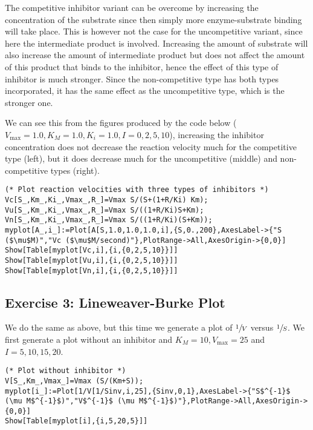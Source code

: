 \documentclass[11pt,a4paper,onecolumn]{article}
\begin{document}
The competitive inhibitor variant can be overcome by increasing the concentration of the substrate since then simply more enzyme-substrate binding will take place. This is however not the case for the uncompetitive variant, since here the intermediate product is involved. Increasing the amount of substrate will also increase the amount of intermediate product but does not affect the amount of this product that binds to the inhibitor, hence the effect of this type of inhibitor is much stronger. Since the non-competitive type has both types incorporated, it has the same effect as the uncompetitive type, which is the stronger one.

We can see this from the figures produced by the code below ($V_{\text{max}} = 1.0, K_M = 1.0, K_i = 1.0, I = 0,2,5,10$), increasing the inhibitor concentration does not decrease the reaction velocity much for the competitive type (left), but it does decrease much for the uncompetitive (middle) and non-competitive types (right).

\begin{lstlisting}[mathescape]
(* Plot reaction velocities with three types of inhibitors *)
Vc[S_,Km_,Ki_,Vmax_,R_]=Vmax S/(S+(1+R/Ki) Km);
Vu[S_,Km_,Ki_,Vmax_,R_]=Vmax S/((1+R/Ki)S+Km);
Vn[S_,Km_,Ki_,Vmax_,R_]=Vmax S/((1+R/Ki)(S+Km));
myplot[A_,i_]:=Plot[A[S,1.0,1.0,1.0,i],{S,0.,200},AxesLabel->{"S ($\mu$M)","Vc ($\mu$M/second)"},PlotRange->All,AxesOrigin->{0,0}]
Show[Table[myplot[Vc,i],{i,{0,2,5,10}}]]
Show[Table[myplot[Vu,i],{i,{0,2,5,10}}]]
Show[Table[myplot[Vn,i],{i,{0,2,5,10}}]] 
\end{lstlisting}

\begin{figure}[H]
  \centering
\end{figure}

\subsection{Exercise 3: Lineweaver-Burke Plot}
We do the same as above, but this time we generate a plot of $\sfrac{1}{V}$ versus $\sfrac{1}{S}$. We first generate a plot without an inhibitor and $K_M = 10, V_{\text{max}} = 25$ and $I = 5,10,15,20$.

\begin{lstlisting}[mathescape]
(* Plot without inhibitor *)
V[S_,Km_,Vmax_]=Vmax (S/(Km+S));
myplot[i_]:=Plot[1/V[1/Sinv,i,25],{Sinv,0,1},AxesLabel->{"S$^{-1}$ (\mu M$^{-1}$)","V$^{-1}$ (\mu M$^{-1}$)"},PlotRange->All,AxesOrigin->{0,0}]
Show[Table[myplot[i],{i,5,20,5}]]
\end{lstlisting}
\end{document}
